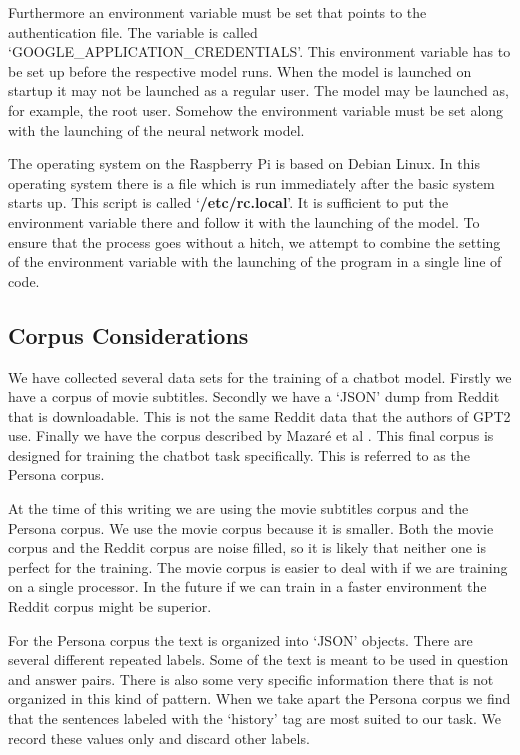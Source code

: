 Furthermore an environment variable must be set that points to the authentication file. The variable is called `GOOGLE\_APPLICATION\_CREDENTIALS'. This environment variable has to be set up before the respective model runs. When the model is launched on startup it may not be launched as a regular user. The model may be launched as, for example, the root user. Somehow the environment variable must be set along with the launching of the neural network model.

The operating system on the Raspberry Pi is based on Debian Linux. In this operating system there is a file which is run immediately after the basic system starts up. This script is called `\textbf{/etc/rc.local}'. It is sufficient to put the environment variable there and follow it with the launching of the model. To ensure that the process goes without a hitch, we attempt to combine the setting of the environment variable with the launching of the program in a single line of code.

\subsection{Corpus Considerations}

We have collected several data sets for the training of a chatbot model. Firstly we have a corpus of movie subtitles. Secondly we have a `JSON' dump from Reddit that is downloadable.  This is not the same Reddit data that the authors of GPT2 use. Finally we have the corpus described by Mazar{\'{e}} et al \cite{DBLP:journals/corr/abs-1809-01984}. This final corpus is designed for training the chatbot task specifically. This is referred to as the Persona corpus.


At the time of this writing we are using the movie subtitles corpus and the Persona corpus. We use the movie corpus because it is smaller. Both the movie corpus and the Reddit corpus are  noise filled, so it is likely that neither one is perfect for the training. The movie corpus is easier to deal with if we are training on a single processor. In the future if we can train in a faster environment the Reddit corpus might be superior.

For the Persona corpus the text is organized into `JSON' objects. There are several different repeated labels. Some of the text is meant to be used in question and answer pairs. There is also some very specific information there that is not organized in this kind of pattern. When we take apart the Persona corpus we find that the sentences labeled with the `history' tag are most suited to our task. We record these values only and discard other labels.

